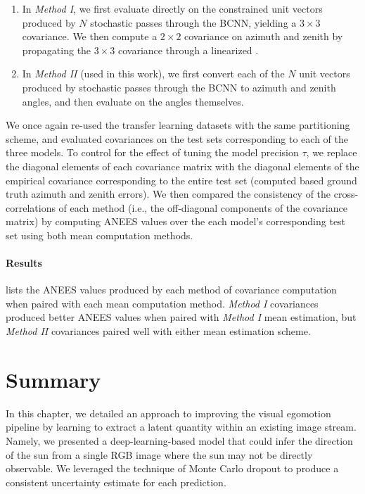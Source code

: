\begin{enumerate} 
\item In \emph{Method I}, we first evaluate  directly on the constrained unit vectors produced by $N$ stochastic passes through the BCNN, yielding a $3 \times 3$ covariance. 
We then compute a $2 \times 2$ covariance on azimuth and zenith by propagating the $3 \times 3$ covariance through a linearized .

\item In \emph{Method II} (used in this work), we first convert each of the $N$ unit vectors produced by stochastic passes through the BCNN to azimuth and zenith angles, and then evaluate  on the angles themselves.
\end{enumerate}

We once again re-used the transfer learning datasets with the same partitioning scheme, and evaluated covariances on the test sets corresponding to each of the three models. 
To control for the effect of tuning the model precision $\tau$, we replace the diagonal elements of each covariance matrix with the diagonal elements of the empirical covariance corresponding to the entire test set (computed based ground truth azimuth and zenith errors). 
We then compared the consistency of the cross-correlations of each method (i.e., the off-diagonal components of the covariance matrix) by computing ANEES values over the each model's corresponding test set using both mean computation methods.  



\paragraph{Results}
 lists the ANEES values produced by each method of covariance computation when paired with each mean computation method. 
\emph{Method I} covariances produced better ANEES values when paired with \emph{Method I} mean estimation, but \emph{Method II} covariances paired well with either mean estimation scheme. 



\section{Summary}

In this chapter, we detailed an approach to improving the visual egomotion pipeline by learning to extract a latent quantity within an existing image stream. Namely, we presented a deep-learning-based model that could infer the direction of the sun from a single RGB image where the sun may not be directly observable. We leveraged the technique of Monte Carlo dropout to produce a consistent uncertainty estimate for each prediction. 

